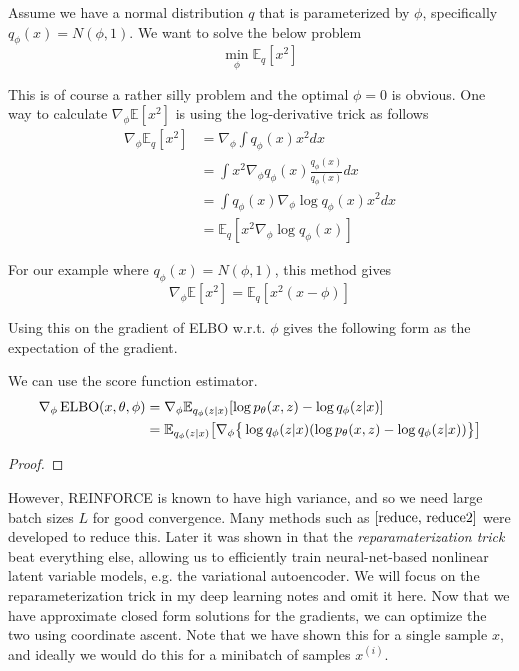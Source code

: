   \begin{example}[Gradient of Expection of $f(x) = x^2$ w.r.t. Gaussian]
    Assume we have a normal distribution $q$ that is parameterized by $\phi$, specifically
    $q_\phi(x) = N(\phi, 1)$. We want to solve the below problem
    \begin{equation}
      \min_\phi \mathbb{E}_q[x^2]
    \end{equation}

    This is of course a rather silly problem and the optimal $\phi = 0$ is obvious. One way to calculate $\nabla_\phi \mathbb{E}[x^2]$ is using the log-derivative trick as follows
    \begin{align}
      \nabla_\phi \mathbb{E}_q[x^2] &= \nabla_\phi\int q_\phi(x)x^2dx \\
      &= \int x^2\nabla_\phi q_\phi(x)\frac{q_\phi(x)}{q_\phi(x)}dx \\
      &= \int q_\phi(x)\nabla_\phi\log q_\phi(x)x^2dx \\
      &= \mathbb{E}_q[x^2\nabla_\phi\log q_\phi(x)]
    \end{align}

    For our example where $q_\phi(x) = N(\phi, 1)$, this method gives
    \begin{equation}
      \nabla_\phi \mathbb{E}[x^2] = \mathbb{E}_q[x^2(x-\phi)]
    \end{equation}
  \end{example}

  Using this on the gradient of ELBO w.r.t. $\phi$ gives the following form as the expectation of the gradient. 

  \begin{lemma}
    We can use the score function estimator. 
    \begin{align}
      \nabla_\phi \operatorname{ELBO}(x, \theta, \phi) & = \nabla_\phi \mathbb{E}_{q_\phi(z|x)}[\log p_\theta(x,z) - \log q_\phi(z|x)] \\
                                         & = \mathbb{E}_{q_\phi(z|x)}\big[ \nabla_\phi \big\{ \log q_\phi(z|x)(\log p_\theta(x,z) - \log q_\phi(z|x)) \big\} \big]
    \end{align}
  \end{lemma}
  \begin{proof}
  \end{proof}

  However, REINFORCE is known to have high variance, and so we need large batch sizes $L$ for good convergence. Many methods such as $\cite{reduce, reduce2}$ were developed to reduce this. Later it was shown in \cite{vae1} that the \textit{reparamaterization trick} beat everything else, allowing us to efficiently train neural-net-based nonlinear latent variable models, e.g. the variational autoencoder. We will focus on the reparameterization trick in my deep learning notes and omit it here.  Now that we have approximate closed form solutions for the gradients, we can optimize the two using coordinate ascent. Note that we have shown this for a single sample $x$, and ideally we would do this for a minibatch of samples $x^{(i)}$. 

